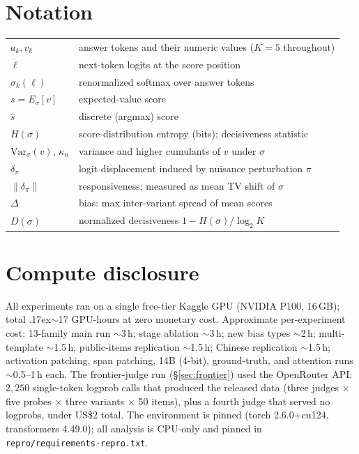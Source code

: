 \documentclass[11pt]{article}
\begin{document}
\section{Notation}\label{app:notation}
\begin{center}\small
\begin{tabular}{ll}
\toprule
$a_k, v_k$ & answer tokens and their numeric values ($K=5$ throughout) \\
$\ell$ & next-token logits at the score position \\
$\sigma_k(\ell)$ & renormalized softmax over answer tokens \\
$s = E_\sigma[v]$ & expected-value score \\
$\hat s$ & discrete (argmax) score \\
$H(\sigma)$ & score-distribution entropy (bits); decisiveness statistic \\
$\mathrm{Var}_\sigma(v)$, $\kappa_n$ & variance and higher cumulants of $v$ under $\sigma$ \\
$\delta_\pi$ & logit displacement induced by nuisance perturbation $\pi$ \\
$\|\delta_\pi\|$ & responsiveness; measured as mean TV shift of $\sigma$ \\
$\Delta$ & bias: max inter-variant spread of mean scores \citep{li2025scoring} \\
$D(\sigma)$ & normalized decisiveness $1-H(\sigma)/\log_2 K$ \\
\bottomrule
\end{tabular}
\end{center}

\section{Compute disclosure}\label{app:compute}
All experiments ran on a single free-tier Kaggle GPU (NVIDIA P100, 16\,GB); total
{\raise.17ex\hbox{$\scriptstyle\sim$}}17 GPU-hours at zero monetary cost. Approximate
per-experiment cost: 13-family main run $\sim$3\,h; stage ablation $\sim$3\,h; new
bias types $\sim$2\,h; multi-template $\sim$1.5\,h; public-items replication
$\sim$1.5\,h; Chinese replication $\sim$1.5\,h; activation patching, span patching,
14B (4-bit), ground-truth, and attention runs $\sim$0.5--1\,h each. The
frontier-judge run (\S\ref{sec:frontier}) used the OpenRouter API: $2{,}250$
single-token logprob calls that produced the released data (three judges $\times$
five probes $\times$ three variants $\times$ 50 items), plus a fourth judge that
served no logprobs, under US\$2 total. The environment is
pinned (torch 2.6.0+cu124, transformers 4.49.0); all analysis is CPU-only and pinned
in \texttt{repro/requirements-repro.txt}.
\end{document}

